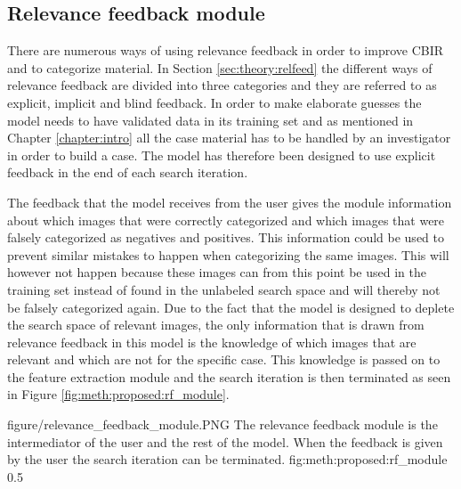 
\subsection{Relevance feedback module}
\label{sec:method:proposed:rf}
There are numerous ways of using relevance feedback in order to improve CBIR and to categorize material. In Section \ref{sec:theory:relfeed} the different ways of relevance feedback are divided into three categories and they are referred to as explicit, implicit and blind feedback. 
In order to make elaborate guesses the model needs to have validated data in its training set and as mentioned in Chapter \ref{chapter:intro} all the case material has to be handled by an investigator in order to build a case. The model has therefore been designed to use explicit feedback in the end of each search iteration.

The feedback that the model receives from the user gives the module information about which images that were correctly categorized and which images that were falsely categorized as negatives and positives. This information could be used to prevent similar mistakes to happen when categorizing the same images. This will however not happen because these images can from this point be used in the training set instead of found in the unlabeled search space and will thereby not be falsely categorized again. Due to the fact that the model is designed to deplete the search space of relevant images, the only information that is drawn from relevance feedback in this model is the knowledge of which images that are relevant and which are not for the specific case. This knowledge is passed on to the feature extraction module and the search iteration is then terminated as seen in Figure \ref{fig:meth:proposed:rf_module}.

\singlefigurenear
{figure/relevance_feedback_module.PNG}
{The relevance feedback module is the intermediator of the user and the rest of the model. When the feedback is given by the user the search iteration can be terminated.}
{fig:meth:proposed:rf_module}
{0.5}

